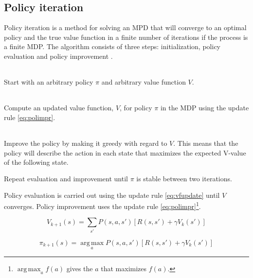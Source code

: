 \subsection{Policy iteration}
\label{sec:pol_itr}

Policy iteration is a method for solving an MPD that will converge to an
optimal policy and the true value function in a finite number of iterations if
the process is a finite MDP. The algorithm consists of three steps:
initialization, policy evaluation and policy improvement
\parencite{barto1998reinforcement}.

\begin{description}
\item[Initialization] \hfill \\
    Start with an arbitrary policy $\pi$ and arbitrary value function $V$.
\item[Policy evaluation] \hfill \\
    Compute an updated value function, $V$, for policy $\pi$ in the MDP using the update rule \eqref{eq:polimpr}.
\item[Policy improvement] \hfill \\
    Improve the policy by making it greedy with regard to $V$. This means that the policy will describe the action in each state that maximizes the expected V-value of the following state. 
\item Repeat evaluation and improvement until $\pi$ is stable between two iterations.
\end{description}

Policy evaluation is carried out using the update rule \eqref{eq:vfupdate} until $V$ converges. 
Policy improvement uses the update rule \eqref{eq:polimpr}\footnote{$\operatorname*{arg\,max} _a f(a)$ gives the $a$ that maximizes $f(a)$.}.


\begin{equation} \label{eq:vfupdate}
V_{k+1} (s) = \sum_{s'} P(s, a, s') \left[ R(s, s') + \gamma V_k(s')  \right]
\end{equation}

\begin{equation} \label{eq:polimpr}
\pi_{k+1} (s) = \operatorname*{arg\,max}_a P(s, a, s') \left[ R(s, s') + \gamma V_k(s') \right]
\end{equation}
